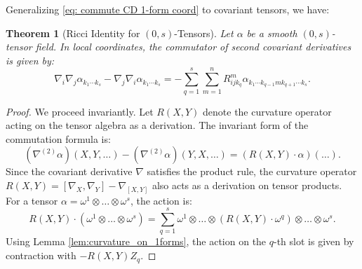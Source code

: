 \documentclass[11pt]{article}
\theoremstyle{plain}
\newtheorem{theorem}{Theorem}[section]
\theoremstyle{definition}
\theoremstyle{remark}
\begin{document}
Generalizing \eqref{eq: commute CD 1-form coord} to covariant tensors, we have:

\begin{theorem}[Ricci Identity for $(0,s)$-Tensors]
\label{thm:ricci_identity}
    Let $\alpha$ be a smooth $(0,s)$-tensor field. In local coordinates, the commutator of second covariant derivatives is given by:
    \begin{equation}
        \nabla_{i}\nabla_{j}\alpha_{k_{1}\cdots k_{s}} - \nabla_{j}\nabla_{i}\alpha_{k_{1}\cdots k_{s}} 
        = - \sum_{q=1}^{s} \sum_{m=1}^n R_{ijk_{q}}^{m} \alpha_{k_{1}\cdots k_{q-1} m k_{q+1}\cdots k_{s}}.
    \end{equation}
\end{theorem}

\begin{proof}
    We proceed invariantly. Let $R(X,Y)$ denote the curvature operator acting on the tensor algebra as a derivation. The invariant form of the commutation formula is:
    \begin{equation}
        (\nabla^{(2)} \alpha)(X, Y, \dots) - (\nabla^{(2)} \alpha)(Y, X, \dots) = (R(X,Y) \cdot \alpha)(\dots).
    \end{equation}
    Since the covariant derivative $\nabla$ satisfies the product rule, the curvature operator $R(X,Y) = [\nabla_X, \nabla_Y] - \nabla_{[X,Y]}$ also acts as a derivation on tensor products. For a tensor $\alpha = \omega^1 \otimes \dots \otimes \omega^s$, the action is:
    \begin{equation}
        R(X,Y) \cdot (\omega^1 \otimes \dots \otimes \omega^s) = \sum_{q=1}^s \omega^1 \otimes \dots \otimes (R(X,Y) \cdot \omega^q) \otimes \dots \otimes \omega^s.
    \end{equation}
    Using Lemma \ref{lem:curvature_on_1forms}, the action on the $q$-th slot is given by contraction with $-R(X,Y)Z_q$.
    

\end{proof}
\end{document}
